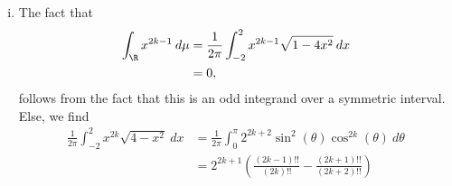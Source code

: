 \documentclass[10pt]{mypackage}
\begin{document}
\begin{solution}
\begin{enumerate}[(i)]
\begin{align*}
      \end{align*}
      By plugging the proposed functional equation into the closed-form expression into $C(z)$, we get
      \begin{align*}
        \frac{1-\sqrt{1-4z}}{2z} &= 1 + z\left( \frac{1-\sqrt{1-4z}}{2z} \right)^2\\
                                 &= 1 + z\left( \frac{1 + \left( 1-4z \right)-2\sqrt{1-4z}}{4z^2} \right)\\
                                 &= \frac{1-\sqrt{1-4z}}{2z}.
      \end{align*}
      Yet, we also observe that
      \begin{align*}
        1 + zC(z)^2 &= z\left( \sum_{k=0}^{\infty}\operatorname{Cat}(k)z^{k} \right)\left( \sum_{\ell=0}^{\infty}\operatorname{Cat}(\ell)z^{\ell} \right)\\
                &= 1 + z\sum_{k=0}^{\infty}\sum_{\ell = 0}^{k}\operatorname{Cat}(k)\operatorname{Cat}\left(k-\ell\right) z^{k}\\
                &= 1 + \sum_{k=0}^{\infty} \sum_{\ell = 0}^{k} \operatorname{Cat}\left( k \right)\operatorname{Cat}\left( k-\ell \right)z^{k+1}\\
                &= 1 + \sum_{k=1}^{\infty} \sum_{\ell = 1}^{k} \operatorname{Cat}\left( k-1 \right)\operatorname{Cat}\left( k-\ell \right) z^{k}\\
                &= \sum_{k=0}^{\infty} \operatorname{Cat}\left( k \right)z^{k},
      \end{align*}
      so that $\operatorname{Cat}(k)$ satisfies the same recurrence relation as the one for the noncrossing pair partitions.
    \item The fact that
      \begin{align*}
        \int_{\R}^{} x^{2k-1}\:d\mu &= \frac{1}{2\pi}\int_{-2}^{2} x^{2k-1}\sqrt{1-4x^2}\:dx\\
                                    &= 0,
      \end{align*}
      follows from the fact that this is an odd integrand over a symmetric interval. Else, we find
      \begin{align*}
        \frac{1}{2\pi} \int_{-2}^{2} x^{2k}\sqrt{4-x^2}\:dx &= \frac{1}{2\pi} \int_{0}^{\pi} 2^{2k+2}\sin^2\left( \theta \right)\cos^{2k}\left( \theta \right)\:d\theta\\
                                                            &= 2^{2k+1}\left( \frac{\left( 2k-1 \right)!!}{\left( 2k \right)!!} - \frac{\left( 2k+1 \right)!!}{\left( 2k+2 \right)!!} \right)\\

\end{align*}
\end{enumerate}
\end{solution}
\end{document}
